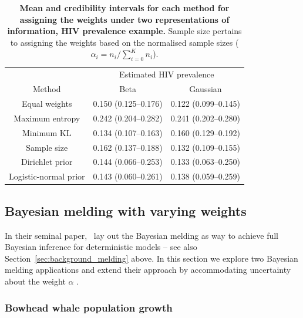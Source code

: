 \documentclass[a4paper, notitlepage, 10pt]{article}
\begin{document}
\begin{table}[ht]
\caption{\textbf{Mean and credibility intervals for each method for assigning the weights under two representations of information, HIV prevalence example.}
Sample size pertains to assigning the  weights based on the normalised sample sizes ($\alpha_i = n_i/ \sum_{i =0}^K n_i$).
}
\centering
\begin{tabular}{ccc}
 \hline
 & \multicolumn{2}{c}{Estimated HIV prevalence} \\
Method & Beta & Gaussian  \\ 
 \hline
 Equal weights &  0.150 (0.125--0.176)&  0.122 (0.099--0.145)\\ 
 Maximum entropy & 0.242 (0.204--0.282)  &  0.241 (0.202--0.280)\\ 
 Minimum KL  & 0.134 (0.107--0.163)  & 0.160 (0.129--0.192) \\ 
 Sample size & 0.162 (0.137--0.188) & 0.132 (0.109--0.155)\\
 Dirichlet prior & 0.144 (0.066--0.253) &  0.133 (0.063--0.250)\\ 
 Logistic-normal prior  & 0.143 (0.060--0.261) & 0.138 (0.059--0.259)\\ 
  \hline
\end{tabular}
\label{tab:prior_MSM}
\end{table}

\subsection{Bayesian melding with varying weights}
\label{sec:melding_apps}

In their seminal paper,~\cite{poole2000} lay out the Bayesian melding as way to achieve full Bayesian inference for deterministic models -- see also Section~\ref{sec:background_melding} above.
In this section we explore two Bayesian melding applications and extend their approach by accommodating uncertainty about the weight $\alpha$ . 

\subsubsection{Bowhead whale population growth}
\label{sec:bowhead}
\end{document}
